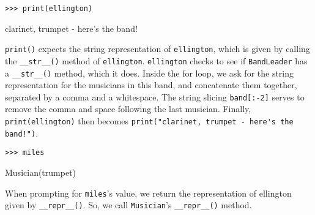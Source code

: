 \begin{blocksection}
\begin{lstlisting}
>>> print(ellington)
\end{lstlisting}
\begin{solution}[.2in]
clarinet, trumpet - here's the band!

\lstinline{print()} expects the string representation of \lstinline{ellington}, which is given by calling the \lstinline{__str__()} method of \lstinline{ellington}. \lstinline{ellington} checks to see if \lstinline{BandLeader} has a \lstinline{__str__()} method, which it does. Inside the for loop, we ask for the string representation for the musicians in this band, and concatenate them together, separated by a comma and a whitespace. The string slicing \lstinline{band[:-2]} serves to remove the comma and space following the last musician. Finally, \lstinline{print(ellington)} then becomes \lstinline{print("clarinet, trumpet - here's the band!")}.
\end{solution}

\vspace{2\baselineskip}
\end{blocksection}
\begin{blocksection}
\begin{lstlisting}
>>> miles
\end{lstlisting}
\begin{solution}[.2in]
Musician(trumpet)

When prompting for \lstinline{miles}’s value, we return the representation of ellington given by \lstinline{__repr__()}. So, we call \lstinline{Musician}’s \lstinline{__repr__()} method.

\end{solution}

\end{blocksection}


